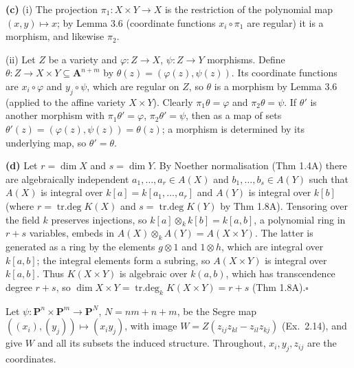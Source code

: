 \documentclass[11pt]{article}
\begin{document}
\textbf{(c)} (i) The projection $\pi_1\colon X\times Y\to X$ is the restriction of the polynomial map $(x,y)\mapsto x$; by Lemma 3.6 (coordinate functions $x_i\circ\pi_1$ are regular) it is a morphism, and likewise $\pi_2$.

(ii) Let $Z$ be a variety and $\varphi\colon Z\to X$, $\psi\colon Z\to Y$ morphisms. Define $\theta\colon Z\to X\times Y\subseteq\mathbf A^{n+m}$ by $\theta(z)=(\varphi(z),\psi(z))$. Its coordinate functions are $x_i\circ\varphi$ and $y_j\circ\psi$, which are regular on $Z$, so $\theta$ is a morphism by Lemma 3.6 (applied to the affine variety $X\times Y$). Clearly $\pi_1\theta=\varphi$ and $\pi_2\theta=\psi$. If $\theta'$ is another morphism with $\pi_1\theta'=\varphi$, $\pi_2\theta'=\psi$, then as a map of sets $\theta'(z)=(\varphi(z),\psi(z))=\theta(z)$; a morphism is determined by its underlying map, so $\theta'=\theta$.

\textbf{(d)} Let $r=\dim X$ and $s=\dim Y$. By Noether normalisation (Thm 1.4A) there are algebraically independent $a_1,\dots,a_r\in A(X)$ and $b_1,\dots,b_s\in A(Y)$ such that $A(X)$ is integral over $k[a]=k[a_1,\dots,a_r]$ and $A(Y)$ is integral over $k[b]$ (where $r=\operatorname{tr.deg}K(X)$ and $s=\operatorname{tr.deg}K(Y)$ by Thm 1.8A). Tensoring over the field $k$ preserves injections, so $k[a]\otimes_kk[b]=k[a,b]$, a polynomial ring in $r+s$ variables, embeds in $A(X)\otimes_kA(Y)=A(X\times Y)$. The latter is generated as a ring by the elements $g\otimes1$ and $1\otimes h$, which are integral over $k[a,b]$; the integral elements form a subring, so $A(X\times Y)$ is integral over $k[a,b]$. Thus $K(X\times Y)$ is algebraic over $k(a,b)$, which has transcendence degree $r+s$, so $\dim X\times Y=\operatorname{tr.deg}_kK(X\times Y)=r+s$ (Thm 1.8A).\hfill$\square$

\pf
Let $\psi\colon\mathbf P^n\times\mathbf P^m\to\mathbf P^N$, $N=nm+n+m$, be the Segre map $((x_i),(y_j))\mapsto(x_iy_j)$, with image $W=Z(z_{ij}z_{kl}-z_{il}z_{kj})$ (Ex.~2.14), and give $W$ and all its subsets the induced structure. Throughout, $x_i,y_j,z_{ij}$ are the coordinates.
\end{document}
